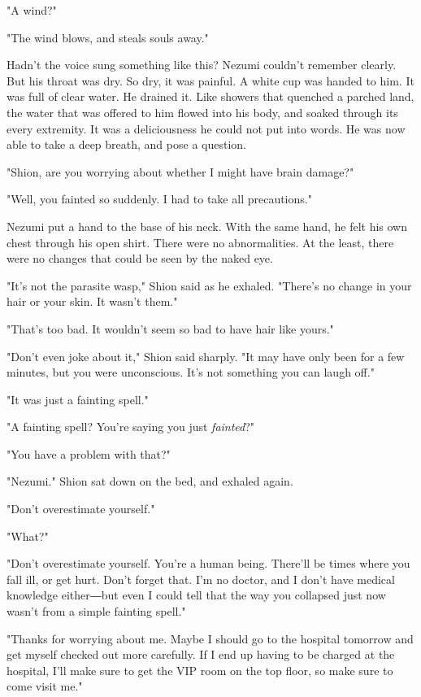 "A wind?"

"The wind blows, and steals souls away."


Hadn't the voice sung something like this? Nezumi couldn't remember
clearly. But his throat was dry. So dry, it was painful. A white cup was
handed to him. It was full of clear water. He drained it. Like showers
that quenched a parched land, the water that was offered to him flowed
into his body, and soaked through its every extremity. It was a
deliciousness he could not put into words. He was now able to take a
deep breath, and pose a question.

"Shion, are you worrying about whether I might have brain damage?"

"Well, you fainted so suddenly. I had to take all precautions."

Nezumi put a hand to the base of his neck. With the same hand, he felt
his own chest through his open shirt. There were no abnormalities. At
the least, there were no changes that could be seen by the naked eye.

"It's not the parasite wasp," Shion said as he exhaled. "There's no
change in your hair or your skin. It wasn't them."

"That's too bad. It wouldn't seem so bad to have hair like yours."

"Don't even joke about it," Shion said sharply. "It may have only been
for a few minutes, but you were unconscious. It's not something you can
laugh off."

"It was just a fainting spell."

"A fainting spell? You're saying you just \emph{fainted}?"

"You have a problem with that?"

"Nezumi." Shion sat down on the bed, and exhaled again.

"Don't overestimate yourself."

"What?"

"Don't overestimate yourself. You're a human being. There'll be times
where you fall ill, or get hurt. Don't forget that. I'm no doctor, and I
don't have medical knowledge either―but even I could tell that the way
you collapsed just now wasn't from a simple fainting spell."

"Thanks for worrying about me. Maybe I should go to the hospital
tomorrow and get myself checked out more carefully. If I end up having
to be charged at the hospital, I'll make sure to get the VIP room on the
top floor, so make sure to come visit me."

